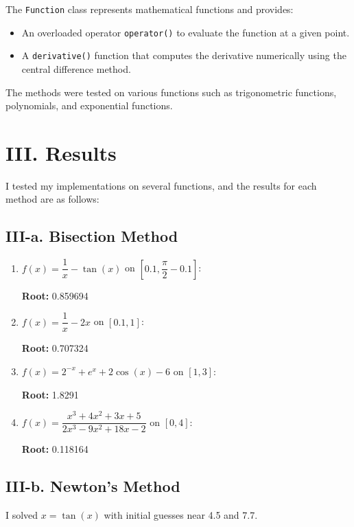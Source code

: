 \documentclass[a4paper]{article}
\begin{document}
The \texttt{Function} class represents mathematical functions and provides:

\begin{itemize}
    \item An overloaded operator \texttt{operator()} to evaluate the function at a given point.
    \item A \texttt{derivative()} function that computes the derivative numerically using the central difference method.
\end{itemize}

The methods were tested on various functions such as trigonometric functions, polynomials, and exponential functions.

\section*{III. Results}

I tested my implementations on several functions, and the results for each method are as follows:

\subsection*{III-a. Bisection Method}

\begin{enumerate}
    \item $f(x) = \dfrac{1}{x} - \tan(x)$ on $[0.1, \dfrac{\pi}{2} - 0.1]$:

    \textbf{Root:} 0.859694

    \item $f(x) = \dfrac{1}{x} - 2x$ on $[0.1, 1]$:

    \textbf{Root:} 0.707324

    \item $f(x) = 2^{-x} + e^{x} + 2\cos(x) - 6$ on $[1, 3]$:

    \textbf{Root:} 1.8291

    \item $f(x) = \dfrac{x^3 + 4x^2 + 3x + 5}{2x^3 - 9x^2 + 18x - 2}$ on $[0, 4]$:

    \textbf{Root:} 0.118164
\end{enumerate}

\subsection*{III-b. Newton's Method}

I solved $x = \tan(x)$ with initial guesses near 4.5 and 7.7.
\end{document}
